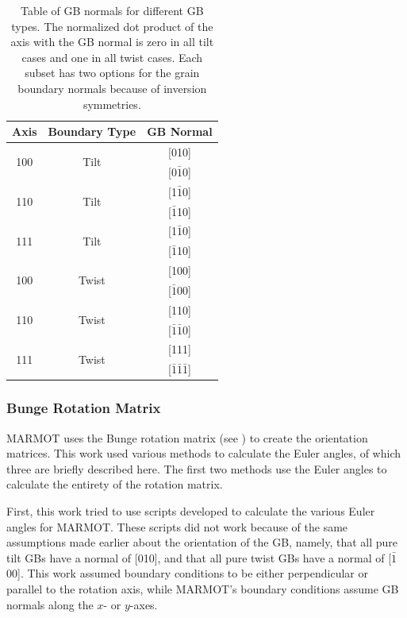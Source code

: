 \documentclass[12pt]{report}
\begin{document}
\begin{table}[ht!]
\centering
\caption{\label{table:geometricgbnorms}Table of GB normals for different GB types. The normalized dot product of the axis with the GB normal is zero in all tilt cases and one in all twist cases.  Each subset has two options for the grain boundary normals because of inversion symmetries.}

\begin{tabular}{ccc}
Axis & Boundary Type & GB Normal \\
\hline
\hline
\multirow{2}{*}{\textlangle{}100\textrangle{}} & \multirow{2}{*}{Tilt} & [010] \\
                              & & [0$\bar{1}$0] \\
\hline
\multirow{2}{*}{\textlangle{}110\textrangle{}} & \multirow{2}{*}{Tilt} & [1$\bar{1}$0] \\
							  & & [$\bar{1}$10] \\
\hline
\multirow{2}{*}{\textlangle{}111\textrangle{}} & \multirow{2}{*}{Tilt} & [1$\bar{1}$0] \\
							  & & [$\bar{1}$10] \\
\hline
\multirow{2}{*}{\textlangle{}100\textrangle{}} & \multirow{2}{*}{Twist} & [100] \\
							  & & [$\bar{1}$00] \\
\hline
\multirow{2}{*}{\textlangle{}110\textrangle{}} & \multirow{2}{*}{Twist} & [110] \\
							  & & [$\bar{1}\bar{1}$0] \\
\hline
\multirow{2}{*}{\textlangle{}111\textrangle{}} & \multirow{2}{*}{Twist} & [111] \\
							  & & [$\bar{1}\bar{1}\bar{1}$] \\
\hline
\hline
\end{tabular}
\end{table}

\subsubsection{Bunge Rotation Matrix\label{PQ:BungeMat}}
MARMOT uses the Bunge rotation matrix (see ) to create the orientation matrices.  This work used various methods to calculate the Euler angles, of which three are briefly described here. The first two methods use the Euler angles to calculate the entirety of the rotation matrix.

First, this work tried to use scripts developed to calculate the various Euler angles for MARMOT.  These scripts did not work because of the same assumptions made earlier about the orientation of the GB, namely, that all pure tilt GBs have a normal of [010], and that all pure twist GBs have a normal of [$\bar{1}$00].  This work assumed boundary conditions to be either perpendicular or parallel to the rotation axis, while MARMOT's boundary conditions assume GB normals along the $x$- or $y$-axes.
\end{document}
